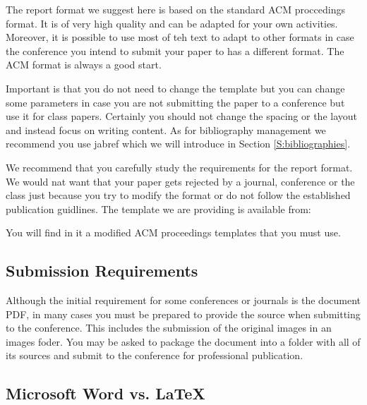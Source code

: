 The report format we suggest here is based on the standard ACM
proccedings format. It is of very high quality and can be adapted for
your own activities. Moreover, it is possible to use most of teh text to
adapt to other formats in case the conference you intend to submit your
paper to has a different format. The ACM format is always a good start.

Important is that you do not need to change the template but you can
change some parameters in case you are not submitting the paper to a
conference but use it for class papers. Certainly you should not change
the spacing or the layout and instead focus on writing content. As for
bibliography management we recommend you use jabref which we will
introduce in Section \ref{S:bibliographies}.

We recommend that you carefully study the requirements for the report
format. We would nat want that your paper gets rejected by a journal,
conference or the class just because you try to modify the format or
do not follow the established publication guidlines. The template we
are providing is available from:


You will find in it a modified ACM proceedings templates that you must
use. 

\subsection{Submission Requirements}\label{submission-requirements}

Although the initial requirement for some conferences or journals is the
document PDF, in many cases you must be prepared to provide the source
when submitting to the conference. This includes the submission of the
original images in an images foder. You may be asked to package the
document into a folder with all of its sources and submit to the
conference for professional publication.

\subsection{Microsoft Word vs. \LaTeX}\label{microsoft-word}

